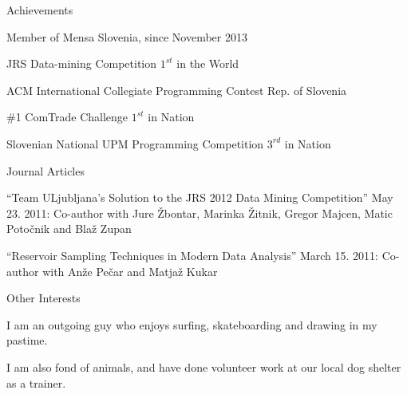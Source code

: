 \documentclass{resume} %
\begin{document}
\begin{rSection}{}


\begin{aSubsection}{Achievements}
\item Member of Mensa Slovenia, since November 2013
\item JRS Data-mining Competition \hfill $1^{st}$ in the World
\item ACM International Collegiate Programming Contest \hfill Rep. of Slovenia
\item \#1 ComTrade Challenge \hfill $1^{st}$ in Nation
\item Slovenian National UPM Programming Competition \hfill $3^{rd}$ in Nation
\end{aSubsection}



\begin{aSubsection}{Journal Articles}
\item ``Team ULjubljana’s Solution to the JRS 2012 Data Mining Competition'' May 23. 2011: Co-author with Jure \v{Z}bontar, Marinka \v{Z}itnik, Gregor Majcen, Matic Poto\v{c}nik and Bla\v{z} Zupan
\item ``Reservoir Sampling Techniques in Modern Data Analysis'' March 15. 2011: Co-author with An\v{z}e Pe\v{c}ar and Matja\v{z} Kukar
\end{aSubsection}



\begin{aSubsection}{Other Interests}
\item I am an outgoing guy who enjoys surfing, skateboarding and drawing in my pastime. 
\item I am also fond of animals, and have done volunteer work at our local dog shelter as a trainer.
\end{aSubsection}





\end{rSection}

\end{document}
